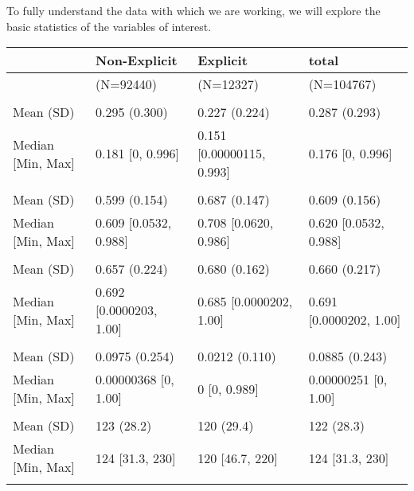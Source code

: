 \documentclass[
]{article}
\begin{document}
To fully understand the data with which we are working, we will explore
the basic statistics of the variables of interest.

\begin{tabular}[t]{llll}
\toprule
  & Non-Explicit & Explicit & total\\
\midrule
 & (N=92440) & (N=12327) & (N=104767)\\
\addlinespace[0.3em]
\multicolumn{4}{l}{\textbf{acousticness}}\\
\hspace{1em}Mean (SD) & 0.295 (0.300) & 0.227 (0.224) & 0.287 (0.293)\\
\hspace{1em}Median [Min, Max] & 0.181 [0, 0.996] & 0.151 [0.00000115, 0.993] & 0.176 [0, 0.996]\\
\addlinespace[0.3em]
\multicolumn{4}{l}{\textbf{danceability}}\\
\hspace{1em}Mean (SD) & 0.599 (0.154) & 0.687 (0.147) & 0.609 (0.156)\\
\hspace{1em}Median [Min, Max] & 0.609 [0.0532, 0.988] & 0.708 [0.0620, 0.986] & 0.620 [0.0532, 0.988]\\
\addlinespace[0.3em]
\multicolumn{4}{l}{\textbf{energy}}\\
\hspace{1em}Mean (SD) & 0.657 (0.224) & 0.680 (0.162) & 0.660 (0.217)\\
\hspace{1em}Median [Min, Max] & 0.692 [0.0000203, 1.00] & 0.685 [0.0000202, 1.00] & 0.691 [0.0000202, 1.00]\\
\addlinespace[0.3em]
\multicolumn{4}{l}{\textbf{instrumentalness}}\\
\hspace{1em}Mean (SD) & 0.0975 (0.254) & 0.0212 (0.110) & 0.0885 (0.243)\\
\hspace{1em}Median [Min, Max] & 0.00000368 [0, 1.00] & 0 [0, 0.989] & 0.00000251 [0, 1.00]\\
\addlinespace[0.3em]
\multicolumn{4}{l}{\textbf{tempo}}\\
\hspace{1em}Mean (SD) & 123 (28.2) & 120 (29.4) & 122 (28.3)\\
\hspace{1em}Median [Min, Max] & 124 [31.3, 230] & 120 [46.7, 220] & 124 [31.3, 230]\\
\addlinespace[0.3em]
\multicolumn{4}{l}{\textbf{loudness}}\\

\end{tabular}
\end{document}
